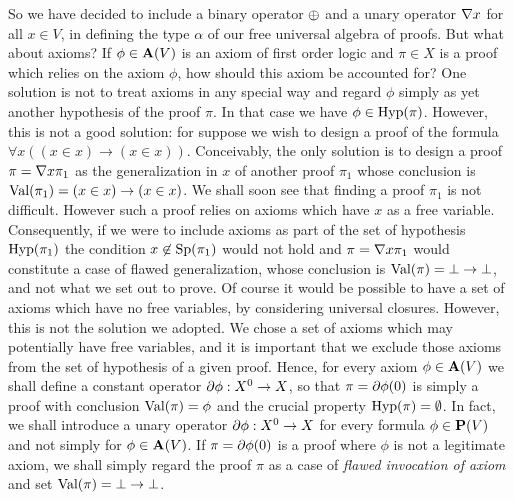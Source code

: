 So we have decided to include a binary operator $\mbox{$\oplus$}$ and a unary
operator $\mbox{$\nabla$} x$ for all $x\in V$, in defining the type $\alpha$ of
our free universal algebra of proofs. But what about axioms? If
$\phi\in\mbox{${\bf A}(V)$}$ is an axiom of first order logic and $\pi\in X$ is a
proof which relies on the axiom $\phi$, how should this axiom be
accounted for? One solution is not to treat axioms in any special
way and regard $\phi$ simply as yet another hypothesis of the proof
$\pi$. In that case we have $\phi\in\mbox{\rm Hyp}(\pi)$. However, this is not
a good solution: for suppose we wish to design a proof of the
formula $\forall x((x\in x)\to(x\in x))$. Conceivably, the only
solution is to design a proof $\pi=\mbox{$\nabla$} x\pi_{1}$ as the
generalization in $x$ of another proof $\pi_{1}$ whose conclusion is
$\mbox{\rm Val}(\pi_{1})=(x\in x)\to(x\in x)$. We shall soon see that finding
a proof $\pi_{1}$ is not difficult. However such a proof relies on
axioms which have $x$ as a free variable. Consequently, if we were
to include axioms as part of the set of hypothesis $\mbox{\rm Hyp}(\pi_{1})$
the condition $x\not\in\mbox{\rm Sp}(\pi_{1})$ would not hold and $\pi=\mbox{$\nabla$}
x\pi_{1}$ would constitute a case of flawed generalization, whose
conclusion is $\mbox{\rm Val}(\pi)=\bot\to\bot$, and not what we set out to
prove. Of course it would be possible to have a set of axioms which
have no free variables, by considering universal closures. However,
this is not the solution we adopted. We chose a set of axioms which
may potentially have free variables, and it is important that we
exclude those axioms from the set of hypothesis of a given proof.
Hence, for every axiom $\phi\in\mbox{${\bf A}(V)$}$ we shall define a constant
operator $\mbox{$\partial$} \phi:X^{0}\to X$, so that $\pi=\mbox{$\partial$}\phi(0)$ is simply
a proof with conclusion $\mbox{\rm Val}(\pi)=\phi$ and the crucial property
$\mbox{\rm Hyp}(\pi)=\emptyset$. In fact, we shall introduce a unary operator
$\mbox{$\partial$}\phi:X^{0}\to X$ for every formula $\phi\in\mbox{${\bf P}(V)$}$ and not simply
for $\phi\in\mbox{${\bf A}(V)$}$. If $\pi=\mbox{$\partial$}\phi(0)$ is a proof where $\phi$ is
not a legitimate axiom, we shall simply regard the proof $\pi$ as a
case of {\em flawed invocation of axiom} and set
$\mbox{\rm Val}(\pi)=\bot\to\bot$.

